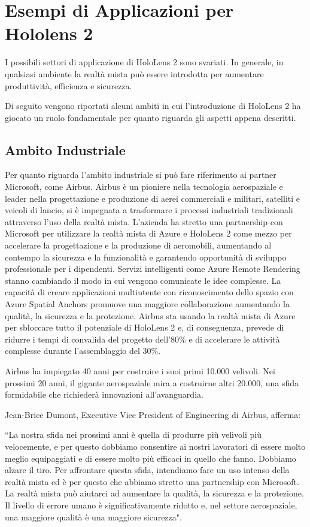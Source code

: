 \chapter{Esempi di Applicazioni per Hololens 2}\label{chap:capitolo3}

I possibili settori di applicazione di HoloLens 2 sono svariati. In generale, in qualsiasi ambiente la realtà mista può essere introdotta per aumentare produttività, efficienza e sicurezza.

Di seguito vengono riportati alcuni ambiti in cui l'introduzione di HoloLens 2 ha giocato un ruolo fondamentale per quanto riguarda gli aspetti appena descritti.

\section{Ambito Industriale}\label{sec:Sezione3.1}
Per quanto riguarda l'ambito industriale si può fare riferimento ai partner Microsoft, come Airbus.
Airbus è un pioniere nella tecnologia aerospaziale e leader nella progettazione e produzione di aerei commerciali e militari, satelliti e veicoli di lancio, si è impegnata a trasformare i processi industriali tradizionali attraverso l'uso della realtà mista. L'azienda ha stretto una partnership con Microsoft per utilizzare la realtà mista di Azure e HoloLens 2 come mezzo per accelerare la progettazione e la produzione di aeromobili, aumentando al contempo la sicurezza e la funzionalità e garantendo opportunità di sviluppo professionale per i dipendenti. Servizi intelligenti come Azure Remote Rendering stanno cambiando il modo in cui vengono comunicate le idee complesse. La capacità di creare applicazioni multiutente con riconoscimento dello spazio con Azure Spatial Anchors promuove una maggiore collaborazione aumentando la qualità, la sicurezza e la protezione. Airbus sta usando la realtà mista di Azure per sbloccare tutto il potenziale di HoloLens 2 e, di conseguenza, prevede di ridurre i tempi di convalida del progetto dell'80\% e di accelerare le attività complesse durante l'assemblaggio del 30\%.

Airbus ha impiegato 40 anni per costruire i suoi primi 10.000 velivoli. Nei prossimi 20 anni, il gigante aerospaziale mira a costruirne altri 20.000, una sfida formidabile che richiederà innovazioni all'avanguardia.

Jean-Brice Dumont, Executive Vice President of Engineering di Airbus, afferma:

\begin{center}
    “La nostra sfida nei prossimi anni è quella di produrre più velivoli più velocemente, e per questo dobbiamo consentire ai nostri lavoratori di essere molto meglio equipaggiati e di essere molto più efficaci in quello che fanno. Dobbiamo alzare il tiro.
    Per affrontare questa sfida, intendiamo fare un uso intenso della realtà mista ed è per questo che abbiamo stretto una partnership con Microsoft.
    La realtà mista può aiutarci ad aumentare la qualità, la sicurezza e la protezione. Il livello di errore umano è significativamente ridotto e, nel settore aerospaziale, una maggiore qualità è una maggiore sicurezza".
\end{center}

